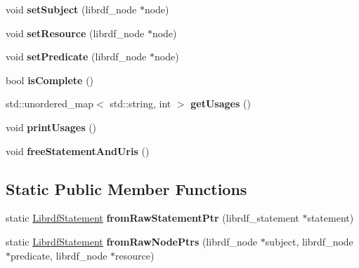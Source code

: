 \begin{DoxyCompactItemize}
void {\bfseries set\+Subject} (librdf\+\_\+node $\ast$node)
\item 
\mbox{\label{classredland_1_1LibrdfStatement_a8b8fd2999e80bd2912af2430503a557a}} 
void {\bfseries set\+Resource} (librdf\+\_\+node $\ast$node)
\item 
\mbox{\label{classredland_1_1LibrdfStatement_a3306876fb080f3d19fca806142f93f87}} 
void {\bfseries set\+Predicate} (librdf\+\_\+node $\ast$node)
\item 
\mbox{\label{classredland_1_1LibrdfStatement_a84a6fae7f1879c2f033001a9927627b0}} 
bool {\bfseries is\+Complete} ()
\item 
\mbox{\label{classredland_1_1LibrdfStatement_af8417e75a1ddb953c64c36b6028d3448}} 
std\+::unordered\+\_\+map$<$ std\+::string, int $>$ {\bfseries get\+Usages} ()
\item 
\mbox{\label{classredland_1_1LibrdfStatement_a1881b122993ff4a24f560b7b31ea3176}} 
void {\bfseries print\+Usages} ()
\item 
\mbox{\label{classredland_1_1LibrdfStatement_a104a61ca5a7568728273c071269e1882}} 
void {\bfseries free\+Statement\+And\+Uris} ()
\end{DoxyCompactItemize}
\subsection*{Static Public Member Functions}
\begin{DoxyCompactItemize}
\item 
\mbox{\label{classredland_1_1LibrdfStatement_a9fb66c801d731ffce13e4d1381c49c29}} 
static \hyperlink{classredland_1_1LibrdfStatement}{Librdf\+Statement} {\bfseries from\+Raw\+Statement\+Ptr} (librdf\+\_\+statement $\ast$statement)
\item 
\mbox{\label{classredland_1_1LibrdfStatement_a4eceaebc10deea27f4c75f7c8b4cccaf}} 
static \hyperlink{classredland_1_1LibrdfStatement}{Librdf\+Statement} {\bfseries from\+Raw\+Node\+Ptrs} (librdf\+\_\+node $\ast$subject, librdf\+\_\+node $\ast$predicate, librdf\+\_\+node $\ast$resource)
\end{DoxyCompactItemize}
